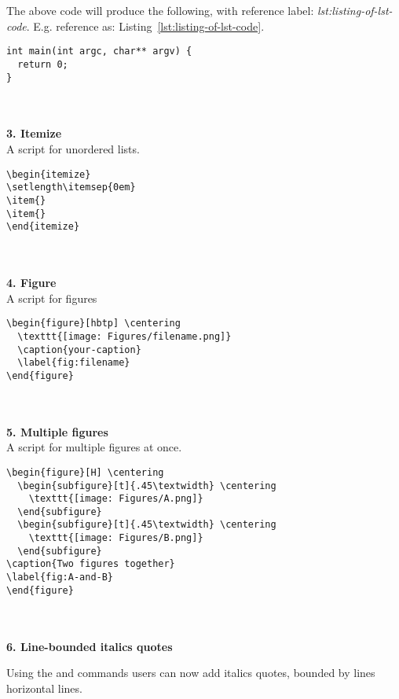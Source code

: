 The above code will produce the following, with reference label: \textit{lst:listing-of-lst-code}. E.g. reference as: Listing~\ref{lst:listing-of-lst-code}.
\lstset{language=c}
\lstset{basicstyle=\footnotesize\ttfamily}
\begin{lstlisting}[caption={This is a listing of C code with caption at the top.},captionpos=t,label={lst:listing-of-lst-code}]
int main(int argc, char** argv) {
  return 0;
}
\end{lstlisting}
~\\ \\ %
\textbf{3. Itemize} \\
A script for unordered lists.
\lstset{language=tex}
\lstset{basicstyle=\small\ttfamily}
\begin{lstlisting}
\begin{itemize}
\setlength\itemsep{0em}
\item{}
\item{}
\end{itemize}
\end{lstlisting}
~\\ \\ %
\newpage
\textbf{4. Figure} \\
A script for figures
\begin{lstlisting}
\begin{figure}[hbtp] \centering
  \texttt{[image: Figures/filename.png]}
  \caption{your-caption}
  \label{fig:filename}
\end{figure}
\end{lstlisting}
~\\ \\ %
\textbf{5. Multiple figures} \\
A script for multiple figures at once.
\begin{lstlisting}
\begin{figure}[H] \centering
  \begin{subfigure}[t]{.45\textwidth} \centering
    \texttt{[image: Figures/A.png]}
  \end{subfigure}
  \begin{subfigure}[t]{.45\textwidth} \centering
    \texttt{[image: Figures/B.png]}
  \end{subfigure}
\caption{Two figures together}
\label{fig:A-and-B}
\end{figure}
\end{lstlisting}
~\\ \\ %
\textbf{6. Line-bounded italics quotes} \\
\begin{itquote}
Using the  and  commands users can now add italics quotes, bounded by lines horizontal lines.
\end{itquote}

